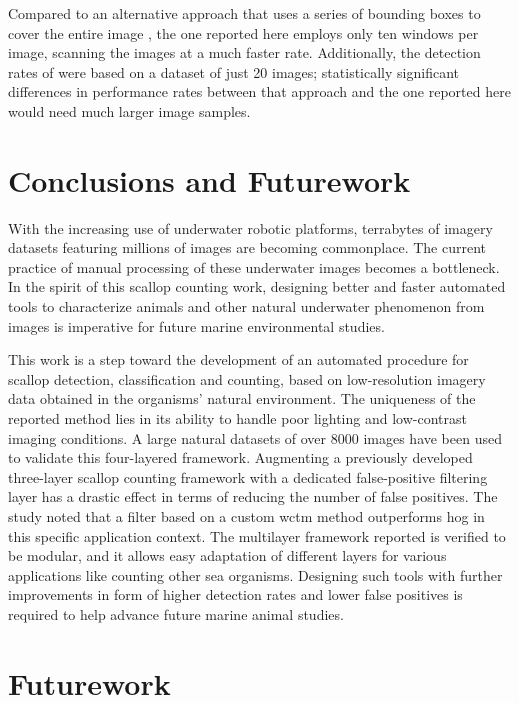 \documentclass {udthesis}
\begin{document}
Compared to an alternative approach that uses a series of bounding boxes to cover the entire image \cite{guomundsson}, the one reported here employs only ten windows per image, scanning the images at a much faster rate.   
Additionally, the detection rates of \cite{guomundsson} were based on a dataset of just 20 images; statistically significant differences in performance rates between that approach and the one reported here would need much larger image samples.

\section{Conclusions and Futurework}

With the increasing use of underwater robotic platforms, terrabytes of imagery datasets featuring millions of images are becoming commonplace. 
The current practice of manual processing of these underwater images becomes a bottleneck. 
In the spirit of this scallop counting work, designing better and faster automated tools  to characterize animals and other natural underwater phenomenon from images is imperative for future marine environmental studies.

This work is a step toward
the development of an automated procedure for scallop detection, classification
and counting, based on low-resolution imagery data obtained in the organisms' natural environment.
The uniqueness of the reported method lies in its ability to handle poor lighting and low-contrast imaging conditions.
A large natural datasets of over 8000 images have been used to validate this four-layered framework.
Augmenting a previously developed three-layer scallop counting framework with a dedicated false-positive filtering layer has a drastic effect in terms of reducing the number of false positives.
The study noted that a filter based on a custom \gls{wctm} method outperforms \gls{hog} in  this specific application context. 
The multilayer framework reported is verified to be modular, and it allows easy adaptation of different layers for various applications like counting other sea organisms. 
Designing such tools with further improvements in form of higher detection rates and lower false positives is required to help advance future marine animal studies.

\section{Futurework}
\end{document}
